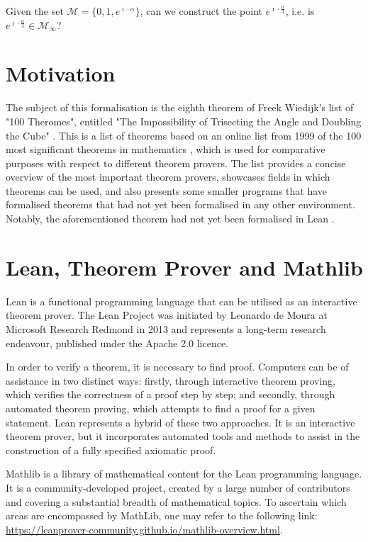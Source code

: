 \begin{problem}
    Given the set $\mathcal{M} = \{0, 1, e^{\imath\cdot\alpha}\}$, can we construct the point $e^{\imath\cdot\frac{\alpha}{3}}$, i.e. is $e^{\imath\cdot\frac{\alpha}{3}} \in \mathcal{M}_{\infty}$?
\end{problem}

\section{Motivation}
The subject of this formalisation is the eighth theorem of Freek Wiedijk's list of "100 Theromes", entitled "The Impossibility of Trisecting the Angle and Doubling the Cube" \cite{Wiedijk}. 
This is a list of theorems based on an online list from 1999 of the 100 most significant theorems in mathematics \cite{Abad_Abad}, which is used for comparative purposes with respect to different theorem provers. 
The list provides a concise overview of the most important theorem provers, showcases fields in which theorems can be used, and also presents some smaller programs that have formalised theorems that had not yet been formalised in any other environment.
 Notably, the aforementioned theorem had not yet been formalised in Lean \cite{Lean_Community}.

\section{Lean, Theorem Prover and Mathlib}
Lean is a functional programming language that can be utilised as an interactive theorem prover. 
The Lean Project was initiated by Leonardo de Moura at Microsoft Research Redmond in 2013 and represents a long-term research endeavour, published under the Apache 2.0 licence.

In order to verify a theorem, it is necessary to find proof. 
Computers can be of assistance in two distinct ways: 
firstly, through interactive theorem proving, which verifies the correctness of a proof step by step; 
and secondly, through automated theorem proving, which attempts to find a proof for a given statement. 
Lean represents a hybrid of these two approaches. 
It is an interactive theorem prover, but it incorporates automated tools and methods to assist in the construction of a fully specified axiomatic proof.\cite{Avigad_deMoura_Kong_Ullrich}


Mathlib is a library of mathematical content for the Lean programming language. It is a community-developed project, created by a large number of contributors and covering a substantial breadth of mathematical topics. To ascertain which areas are encompassed by MathLib, one may refer to the following link: \url{https://leanprover-community.github.io/mathlib-overview.html}. 


